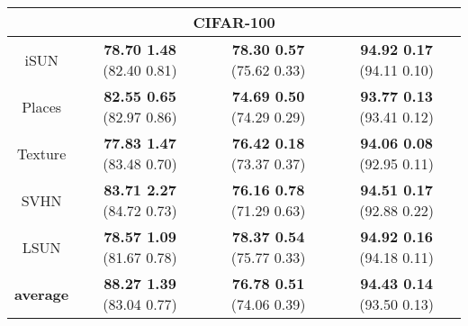 \documentclass{article}
\begin{document}
\begin{table}[t]
{\begin{tabular}{c|ccc}
\multicolumn{4}{c}{\cellcolor{greyL}CIFAR-100} \\
\midrule[1pt]
iSUN               & \textbf{78.70  1.48} (82.40  0.81) & \textbf{78.30  0.57} (75.62  0.33) & \textbf{94.92  0.17} (94.11  0.10) \\ 
Places        & \textbf{82.55  0.65} (82.97  0.86) & \textbf{74.69  0.50} (74.29  0.29) & \textbf{93.77  0.13} (93.41  0.12) \\
Texture            & \textbf{77.83  1.47} (83.48  0.70) & \textbf{76.42  0.18} (73.37  0.37) & \textbf{94.06  0.08} (92.95  0.11) \\
SVHN               & \textbf{83.71  2.27} (84.72  0.73) & \textbf{76.16  0.78} (71.29  0.63) & \textbf{94.51  0.17} (92.88  0.22) \\
LSUN             & \textbf{78.57  1.09} (81.67  0.78) & \textbf{78.37  0.54} (75.77  0.33) & \textbf{94.92  0.16} (94.18  0.11) \\
\midrule
\textbf{average}   & \textbf{88.27  1.39} (83.04  0.77) & \textbf{76.78  0.51} (74.06  0.39) & \textbf{94.43  0.14} (93.50  0.13) \\ \bottomrule[1.5pt]      
\end{tabular}
}
\end{table}
\end{document}
